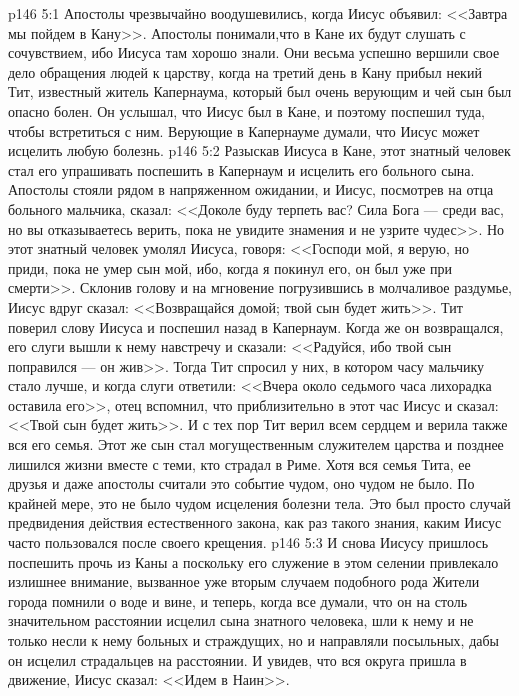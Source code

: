 \vs p146 5:1 Апостолы чрезвычайно воодушевились, когда Иисус объявил: <<Завтра мы пойдем в Кану>>. Апостолы понимали,что в Кане их будут слушать с сочувствием, ибо Иисуса там хорошо знали. Они весьма успешно вершили свое дело обращения людей к царству, когда на третий день в Кану прибыл некий Тит, известный житель Капернаума, который был очень верующим и чей сын был опасно болен. Он услышал, что Иисус был в Кане, и поэтому поспешил туда, чтобы встретиться с ним. Верующие в Капернауме думали, что Иисус может исцелить любую болезнь.
\vs p146 5:2 Разыскав Иисуса в Кане, этот знатный человек стал его упрашивать поспешить в Капернаум и исцелить его больного сына. Апостолы стояли рядом в напряженном ожидании, и Иисус, посмотрев на отца больного мальчика, сказал: <<Доколе буду терпеть вас? Сила Бога --- среди вас, но вы отказываетесь верить, пока не увидите знамения и не узрите чудес>>. Но этот знатный человек умолял Иисуса, говоря: <<Господи мой, я верую, но приди, пока не умер сын мой, ибо, когда я покинул его, он был уже при смерти>>. Склонив голову и на мгновение погрузившись в молчаливое раздумье, Иисус вдруг сказал: <<Возвращайся домой; твой сын будет жить>>. Тит поверил слову Иисуса и поспешил назад в Капернаум. Когда же он возвращался, его слуги вышли к нему навстречу и сказали: <<Радуйся, ибо твой сын поправился --- он жив>>. Тогда Тит спросил у них, в котором часу мальчику стало лучше, и когда слуги ответили: <<Вчера около седьмого часа лихорадка оставила его>>, отец вспомнил, что приблизительно в этот час Иисус и сказал: <<Твой сын будет жить>>. И с тех пор Тит верил всем сердцем и верила также вся его семья. Этот же сын стал могущественным служителем царства и позднее лишился жизни вместе с теми, кто страдал в Риме. Хотя вся семья Тита, ее друзья и даже апостолы считали это событие чудом, оно чудом не было. По крайней мере, это не было чудом исцеления болезни тела. Это был просто случай предвидения действия естественного закона, как раз такого знания, каким Иисус часто пользовался после своего крещения.
\vs p146 5:3 И снова Иисусу пришлось поспешить прочь из Каны а поскольку его служение в этом селении привлекало излишнее внимание, вызванное уже вторым случаем подобного рода Жители города помнили о воде и вине, и теперь, когда все думали, что он на столь значительном расстоянии исцелил сына знатного человека, шли к нему и не только несли к нему больных и страждущих, но и направляли посыльных, дабы он исцелил страдальцев на расстоянии. И увидев, что вся округа пришла в движение, Иисус сказал: <<Идем в Наин>>.
